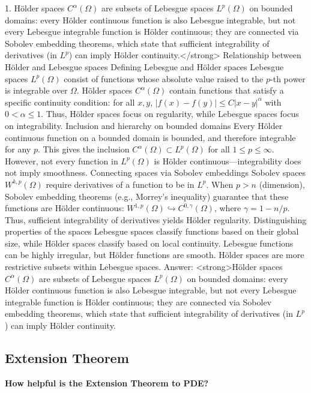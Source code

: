 \documentclass[12pt,a4paper]{report}
\begin{document}
\begin{description}
1. Hölder spaces \(C^{\alpha}(\Omega)\) are subsets of Lebesgue spaces \(L^p(\Omega)\) on bounded domains: every Hölder continuous function is also Lebesgue integrable, but not every Lebesgue integrable function is Hölder continuous; they are connected via Sobolev embedding theorems, which state that sufficient integrability of derivatives (in \(L^p\)) can imply Hölder continuity.</strong>
Relationship between Hölder and Lebesgue spaces
Defining Lebesgue and Hölder spaces
Lebesgue spaces \(L^p(\Omega)\) consist of functions whose absolute value raised to the \(p\)-th power is integrable over \(\Omega\). Hölder spaces \(C^{\alpha}(\Omega)\) contain functions that satisfy a specific continuity condition: for all \(x, y\), \(|f(x) - f(y)| \leq C|x-y|^{\alpha}\) with \(0 < \alpha \leq 1\). Thus, Hölder spaces focus on regularity, while Lebesgue spaces focus on integrability.
Inclusion and hierarchy on bounded domains
Every Hölder continuous function on a bounded domain is bounded, and therefore integrable for any \(p\). This gives the inclusion \(C^{\alpha}(\Omega) \subset L^p(\Omega)\) for all \(1 \leq p \leq \infty\). However, not every function in \(L^p(\Omega)\) is Hölder continuous—integrability does not imply smoothness.
Connecting spaces via Sobolev embeddings
Sobolev spaces \(W^{k,p}(\Omega)\) require derivatives of a function to be in \(L^p\). When \(p > n\) (dimension), Sobolev embedding theorems (e.g., Morrey's inequality) guarantee that these functions are Hölder continuous: \(W^{1,p}(\Omega) \hookrightarrow C^{0, \gamma}(\Omega)\), where \(\gamma = 1 - n/p\). Thus, sufficient integrability of derivatives yields Hölder regularity.
Distinguishing properties of the spaces
Lebesgue spaces classify functions based on their global size, while Hölder spaces classify based on local continuity. Lebesgue functions can be highly irregular, but Hölder functions are smooth. Hölder spaces are more restrictive subsets within Lebesgue spaces.
Answer: <strong>Hölder spaces \(C^{\alpha}(\Omega)\) are subsets of Lebesgue spaces \(L^p(\Omega)\) on bounded domains: every Hölder continuous function is also Lebesgue integrable, but not every Lebesgue integrable function is Hölder continuous; they are connected via Sobolev embedding theorems, which state that sufficient integrability of derivatives (in \(L^p\)) can imply Hölder continuity.

\HLINE
\subsection*{Extension Theorem}
\item \textbf{How helpful is the Extension Theorem to PDE?}\\


\end{description}
\end{document}
